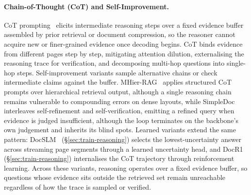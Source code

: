\documentclass[11pt]{article}
\begin{document}
\paragraph{Chain-of-Thought (CoT) and Self-Improvement.}
CoT prompting~\cite{wei2022chainofthought} elicits intermediate reasoning steps over a fixed evidence buffer assembled by prior retrieval or document compression, so the reasoner cannot acquire new or finer-grained evidence once decoding begins. CoT binds evidence from different pages step by step, mitigating attention dilution, externalising the reasoning trace for verification, and decomposing multi-hop questions into single-hop steps. Self-improvement variants sample alternative chains or check intermediate claims against the buffer. MHier-RAG~\cite{gong2025mhierrag} applies structured CoT prompts over hierarchical retrieval output, although a single reasoning chain remains vulnerable to compounding errors on dense layouts, while SimpleDoc~\cite{jain2025simpledoc} interleaves self-refinement and self-verification, emitting a refined query when evidence is judged insufficient, although the loop terminates on the backbone's own judgement and inherits its blind spots. Learned variants extend the same pattern: DocSLM~\cite{hannan2025docslm} (\S\ref{sec:train-reasoning}) selects the lowest-uncertainty answer across streaming page segments through a learned uncertainty head, and DocR1~\cite{xiong2026docr1} (\S\ref{sec:train-reasoning}) internalises the CoT trajectory through reinforcement learning. Across these variants, reasoning operates over a fixed evidence buffer, so questions whose evidence sits outside the retrieved set remain unreachable regardless of how the trace is sampled or verified.
\end{document}
